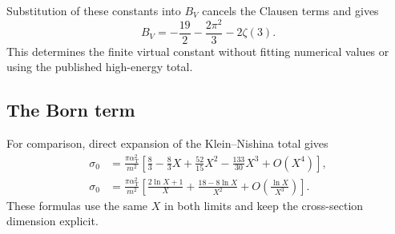 

Substitution of these constants into $B_V$ cancels the Clausen terms
and gives
\begin{equation}
 B_V=- \frac{19}{2} - \frac{2 \pi^{2}}{3} - 2 \zeta\left(3\right).
\end{equation}
This determines the finite virtual constant without fitting numerical
values or using the published high-energy total.

\subsection{The Born term}
For comparison, direct expansion of the Klein--Nishina total gives
\begin{align}
 \sigma_0&=\frac{\pi\alpha_{\mathrm T}^2}{m^2}
 \left[\frac83-\frac83X+\frac{52}{15}X^2-\frac{133}{30}X^3+O(X^4)\right],\\
 \sigma_0&=\frac{\pi\alpha_{\mathrm T}^2}{m^2}
 \left[\frac{2\ln X+1}{X}
 +\frac{18-8\ln X}{X^2}
 +O\!\left(\frac{\ln X}{X^3}\right)\right].
\end{align}
These formulas use the same $X$ in both limits and keep the cross-section
dimension explicit.
